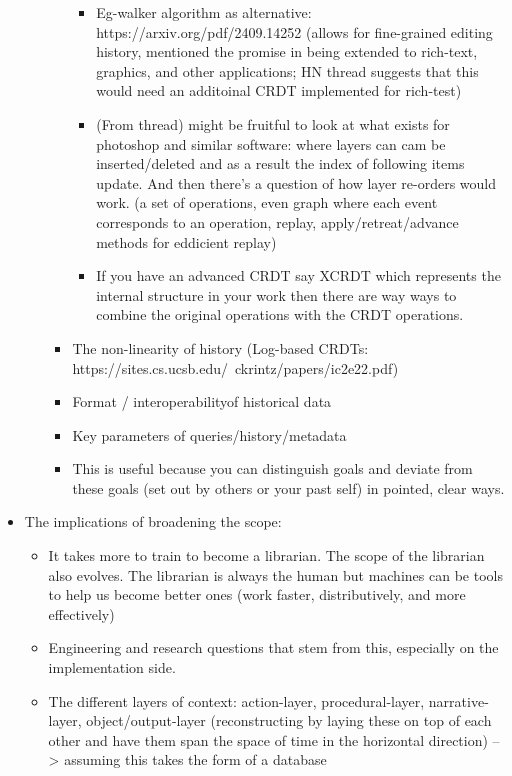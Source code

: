 \documentclass[
]{article}
\providecommand{\tightlist}{%
  \setlength{\itemsep}{0pt}\setlength{\parskip}{0pt}}\usepackage{longtable,booktabs,array}
\begin{document}
\begin{itemize}
\begin{itemize}
\begin{itemize}
      \begin{itemize}
      \item
        Eg-walker algorithm as alternative:
        https://arxiv.org/pdf/2409.14252 (allows for fine-grained
        editing history, mentioned the promise in being extended to
        rich-text, graphics, and other applications; HN thread suggests
        that this would need an additoinal CRDT implemented for
        rich-test)
      \item
        (From thread) might be fruitful to look at what exists for
        photoshop and similar software: where layers can cam be
        inserted/deleted and as a result the index of following items
        update. And then there's a question of how layer re-orders would
        work. (a set of operations, even graph where each event
        corresponds to an operation, replay, apply/retreat/advance
        methods for eddicient replay)
      \item
        If you have an advanced CRDT say XCRDT which represents the
        internal structure in your work then there are way ways to
        combine the original operations with the CRDT operations.
      \end{itemize}
    \item
      The non-linearity of history (Log-based CRDTs:
      https://sites.cs.ucsb.edu/~ckrintz/papers/ic2e22.pdf)
    \item
      Format / interoperabilityof historical data
    \item
      Key parameters of queries/history/metadata
    \end{itemize}

    \begin{itemize}
    \tightlist
    \item
      This is useful because you can distinguish goals and deviate from
      these goals (set out by others or your past self) in pointed,
      clear ways.
    \end{itemize}
  \end{itemize}
\item
  The implications of broadening the scope:

  \begin{itemize}
  \item
    It takes more to train to become a librarian. The scope of the
    librarian also evolves. The librarian is always the human but
    machines can be tools to help us become better ones (work faster,
    distributively, and more effectively)
  \item
    Engineering and research questions that stem from this, especially
    on the implementation side.
  \item
    The different layers of context: action-layer, procedural-layer,
    narrative-layer, object/output-layer (reconstructing by laying these
    on top of each other and have them span the space of time in the
    horizontal direction) --\textgreater{} assuming this takes the form
    of a database


\end{itemize}
\end{itemize}
\end{document}
